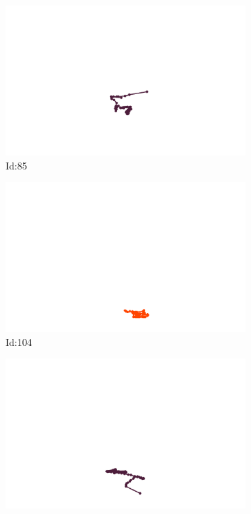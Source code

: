 \documentclass[12pt,twoside]{report}
\begin{document}
\begin{figure}
\centering
\begin{subfigure}[b]{0.20\textwidth}
\centering
\includegraphics[width=\textwidth]{../trajectories/85.png}
\caption{Id:85}
\end{subfigure}
\begin{subfigure}[b]{0.20\textwidth}
\centering
\includegraphics[width=\textwidth]{../trajectories/104.png}
\caption{Id:104}
\end{subfigure}
\begin{subfigure}[b]{0.20\textwidth}
\centering
\includegraphics[width=\textwidth]{../trajectories/106.png}

\end{subfigure}
\end{figure}
\end{document}

